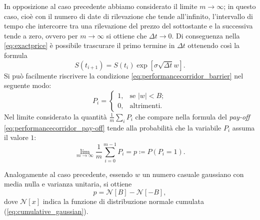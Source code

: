 In opposizione al caso precedente abbiamo considerato il limite $m \rightarrow \infty$; in questo caso, cioè con il numero di date di rilevazione che tende all'infinito, l'intervallo di tempo che intercorre tra una rilevazione del prezzo del sottostante e la successiva tende a zero, ovvero per $m \rightarrow \infty$ si ottiene che $\Delta t \rightarrow 0$. Di conseguenza nella \eqref{eq:exactprice} è possibile trascurare il primo termine in $\Delta t$ ottenendo così la formula
\begin{equation}
     S(t_{i+1}) = S(t_i) \exp{\left[ \sigma \sqrt{\Delta t} w\right]}.
\end{equation}
Si può facilmente riscrivere la condizione \eqref{eq:performancecorridor_barrier} nel seguente modo:
\begin{equation}
    P_i = \begin{cases}
    1, & \text{se} \,\,\left| w \right| < B;\\
    0, & \text{altrimenti}.
    \label{eq:condition_m}
  \end{cases}
\end{equation}
Nel limite considerato la quantità $ \frac{1}{m} \sum_{i}{P_i}$ che compare nella formula del \textit{pay-off} \eqref{eq:performancecorridor_pay-off} tende alla probabilità che la variabile $P_{i}$ assuma il valore $1$:
\begin{equation}
    \lim_{m \to \infty} \frac{1}{m} \sum_{i=0}^{m-1}{P_i} = p \coloneqq P\left(P_{i}=1\right).
\end{equation}

Analogamente al caso precedente, essendo $w$ un numero casuale gaussiano con media nulla e varianza unitaria, si ottiene
\begin{equation}
    p = \mathcal{N}[B] - \mathcal{N}[-B],
\end{equation}
dove $\mathcal{N}[x]$ indica la funzione di distribuzione normale cumulata (\ref{eq:cumulative_gaussian}).

